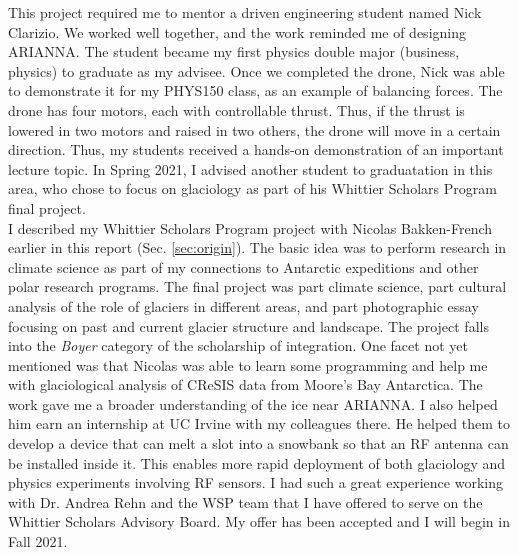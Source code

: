 \documentclass[../../../main.tex]{subfiles}
\begin{document}
This project required me to mentor a driven engineering student named Nick Clarizio.  We worked well together, and the work reminded me of designing ARIANNA.  The student became my first physics double major (business, physics) to graduate as my advisee.  Once we completed the drone, Nick was able to demonstrate it for my PHYS150 class, as an example of balancing forces.  The drone has four motors, each with controllable thrust.  Thus, if the thrust is lowered in two motors and raised in two others, the drone will move in a certain direction.  Thus, my students received a hands-on demonstration of an important lecture topic.  In Spring 2021, I advised another student to graduatation in this area, who chose to focus on glaciology as part of his Whittier Scholars Program final project.
\\
\vspace{0.25cm}
I described my Whittier Scholars Program project with Nicolas Bakken-French earlier in this report (Sec. \ref{sec:origin}).  The basic idea was to perform research in climate science as part of my connections to Antarctic expeditions and other polar research programs.  The final project was part climate science, part cultural analysis of the role of glaciers in different areas, and part photographic essay focusing on past and current glacier structure and landscape.  The project falls into the \textit{Boyer} category of the scholarship of integration.  One facet not yet mentioned was that Nicolas was able to learn some programming and help me with glaciological analysis of CReSIS data from Moore's Bay Antarctica.  The work gave me a broader understanding of the ice near ARIANNA.  I also helped him earn an internship at UC Irvine with my colleagues there.  He helped them to develop a device that can melt a slot into a snowbank so that an RF antenna can be installed inside it.  This enables more rapid deployment of both glaciology and physics experiments involving RF sensors.  I had such a great experience working with Dr. Andrea Rehn and the WSP team that I have offered to serve on the Whittier Scholars Advisory Board.  My offer has been accepted and I will begin in Fall 2021.
\end{document}
